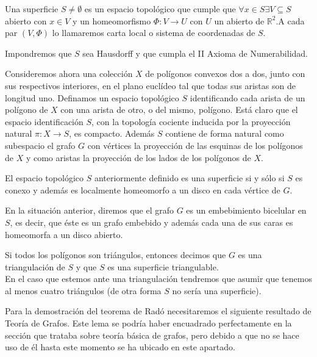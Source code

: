 \documentclass[12pt,a4paper,oldfontcommands]{memoir}
\begin{document}
\begin{definition}
Una superficie $S \neq \emptyset$ es un espacio topológico que cumple que $\forall x \in S \exists V \subseteq S$ abierto con $x \in V$ y un homeomorfismo $\Phi : V \rightarrow U$ con $U$ un abierto de $\mathbb{R}^2$.A cada par $(V,\Phi)$ lo llamaremos carta local o sistema de coordenadas de $S$.
\end{definition}

\begin{remark}
Impondremos que $S$ sea Hausdorff y que cumpla el II Axioma de Numerabilidad.
\end{remark}

Consideremos ahora una colección $X$ de polígonos convexos dos a dos, junto con sus respectivos interiores, en el plano euclídeo tal que todas sus aristas son de longitud uno. Definamos un espacio topológico $S$ identificando cada arista de un polígono de $X$  con una  arista de otro, o del mismo, polígono. Está claro que el espacio identificación $S$, con la topología cociente inducida por la proyección natural $\pi\colon X\to S$,  es compacto. Además $S$ contiene de forma natural como subespacio el grafo $G$ con  vértices   la proyección de las esquinas de los polígonos de $X$ y como aristas la proyección de los lados de los polígonos de $X$.

\begin{lemma}
El espacio topológico $S$ anteriormente definido es una superficie si y sólo si $S$ es conexo y además es localmente homeomorfo a un disco en cada vértice de $G$.
\end{lemma}

\begin{definition}
En la situación anterior, diremos que el grafo $G$ es un embebimiento bicelular en $S$, es decir, que éste es un grafo embebido y además cada una de sus caras es homeomorfa a un disco abierto.
\end{definition}

\begin{definition}
Si todos los polígonos son triángulos, entonces decimos que $G$ es una triangulación de $S$ y que $S$ es una superficie triangulable.
\\
En el caso que estemos ante una triangulación tendremos que asumir que tenemos al menos cuatro triángulos (de otra forma $S$ no sería una superficie).
\end{definition}

Para la demostración del teorema de Radó necesitaremos el siguiente resultado de Teoría de Grafos.
Este lema se podría haber encuadrado perfectamente en la sección que trataba sobre teoría básica de grafos, pero debido a que no se hace uso de él hasta este momento se ha ubicado en este apartado.
\end{document}
